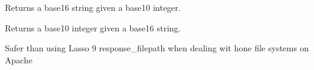 \documentclass[letterpaper,10pt,english]{sphinxmanual}
\begin{document}

\begin{fulllineitems}
\label{knop_utils:knop_math_dectohex}
Returns a base16 string given a base10 integer.

\end{fulllineitems}


\begin{fulllineitems}
\label{knop_utils:knop_math_hexToDec}
Returns a base10 integer given a base16 string.

\end{fulllineitems}


\begin{fulllineitems}
\label{knop_utils:knop_normalize_slashes}
\end{fulllineitems}


\begin{fulllineitems}
\label{knop_utils:knop_response_filepath}
Safer than using Lasso 9 response\_filepath when dealing wit hone file systems on Apache

\end{fulllineitems}


\begin{fulllineitems}
\label{knop_utils:knop_seed}
\end{fulllineitems}


\begin{fulllineitems}
\label{knop_utils:knop_stripbackticks}
\end{fulllineitems}


\begin{fulllineitems}
\end{fulllineitems}
\end{document}
